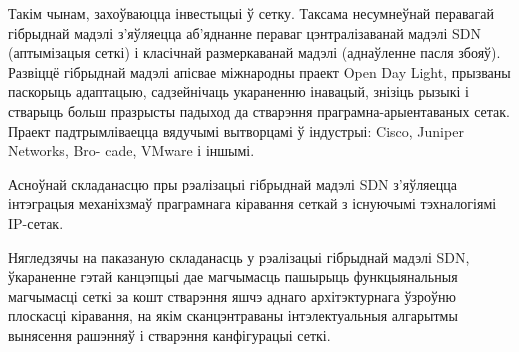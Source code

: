 Такім чынам, захоўваюцца інвестыцыі ў сетку. Таксама несумнеўнай перавагай гібрыднай
мадэлі з'яўляецца аб'яднанне пераваг цэнтралізаванай мадэлі SDN (аптымізацыя
сеткі) і класічнай размеркаванай мадэлі (аднаўленне пасля збояў).
Развіццё гібрыднай мадэлі апісвае міжнародны праект Open Day Light, прызваны паскорыць адаптацыю, садзейнічаць укараненню інавацый, знізіць рызыкі і стварыць больш празрысты падыход да стварэння праграмна-арыентаваных сетак.
Праект падтрымліваецца вядучымі вытворцамі ў індустрыі: Cisco, Juniper Networks, Bro-
cade, VMware і іншымі.

Асноўнай складанасцю пры рэалізацыі гібрыднай мадэлі SDN з'яўляецца інтэграцыя механіхзмаў праграмнага кіравання сеткай з існуючымі тэхналогіямі IP-сетак.

Нягледзячы на паказаную складанасць у рэалізацыі гібрыднай мадэлі SDN, ўкараненне
гэтай канцэпцыі дае магчымасць пашырыць функцыянальныя магчымасці сеткі за кошт
стварэння яшчэ аднаго архітэктурнага ўзроўню плоскасці кіравання, на якім
сканцэнтраваны інтэлектуальныя алгарытмы вынясення рашэнняў і стварэння канфігурацыі сеткі.
